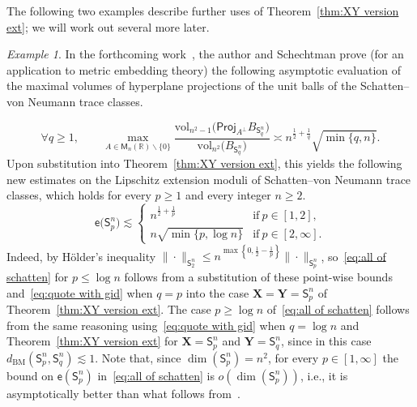 \documentclass[11pt,reqno]{amsart}
\renewcommand{\le}{\leqslant}
\renewcommand{\ge}{\geqslant}
\renewcommand{\setminus}{\smallsetminus}
\newcommand{\proj}{\mathsf{Proj}}
\newcommand{\X}{\mathbf X}
\newcommand{\Y}{\mathbf Y}
\newcommand{\R}{\mathbb R}
\theoremstyle{remark}
\newtheorem{example}[theorem]{Example}
\newcommand{\M}{\mathsf{M}}
\newcommand{\sfS}{\mathsf{S}}
\newcommand{\BM}{\mathrm{BM}}
\newcommand{\ee}{\mathsf{e}}
\newcommand{\vol}{\mathrm{vol}}
\renewcommand{\1}{\mathbf 1}
\begin{document}
\smallskip
The following two examples describe further uses of Theorem~\ref{thm:XY version ext}; we will work out several more later.


\begin{example}\label{rem:from alpha paper} In the forthcoming work~\cite{NS18-extension}, the author and Schechtman prove (for an application to metric embedding theory) the following asymptotic evaluation of the maximal volumes of hyperplane projections of the unit balls of the Schatten--von Neumann trace classes.

\begin{equation}\label{eq:quote with gid}
\forall q\ge 1,\qquad \max_{A\in \M_n(\R)\setminus\{0\}}\frac{\vol_{n^2-1}\big(\proj_{A^\perp}B_{\sfS_q^n}\big)}{\vol_{n^2}\big(B_{\sfS_q^n}\big)}\asymp n^{\frac12+\frac{1}{q}}\sqrt{\min\{q,n\}}.
\end{equation}
Upon substitution into Theorem~\ref{thm:XY version ext}, this yields the following new estimates on the Lipschitz extension moduli of  Schatten--von Neumann trace classes, which holds for every $p\ge 1$ and every integer $n\ge 2$.
\begin{equation}\label{eq:all of schatten}
\ee\big(\sfS_p^n\big)\lesssim \left\{\begin{array}{ll}n^{\frac12+\frac{1}{p}}&\mathrm{if}\ p\in [1,2],\\
n\sqrt{\min\{p,\log n\}}& \mathrm{if}\ p\in [2,\infty].\end{array}\right.
\end{equation}
Indeed, by H\"older's inequality  $\|\cdot\|_{\sfS_2^n}\le n^{\max\left\{0,\frac12-\frac{1}{p}\right\}}\|\cdot\|_{\sfS_p^n}$, so~\eqref{eq:all of schatten} for $p\le \log n$ follows from a substitution of these point-wise bounds and~\eqref{eq:quote with gid}  when $q=p$   into the case $\X=\Y=\sfS_p^n$ of Theorem~\ref{thm:XY version ext}. The case $p\ge \log n$ of~\eqref{eq:all of schatten} follows from the same reasoning using~\eqref{eq:quote with gid} when $q=\log n$ and  Theorem~\ref{thm:XY version ext} for $\X=\sfS_p^n$ and $\Y=\sfS_{q}^n$, since in this case $d_{\BM}(\sfS_p^n,\sfS_q^n)\lesssim 1$. Note that, since $\dim(\sfS_p^n)=n^2$, for every $p\in [1,\infty]$ the bound on $\ee(\sfS_p^n)$ in~\eqref{eq:all of schatten} is $o(\dim(\sfS_p^n))$, i.e., it is asymptotically better than what follows from~\cite{JLS86}.


\end{example}
\end{document}
